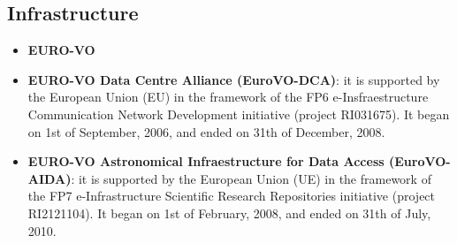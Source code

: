 \subsection{Infrastructure}
\begin{itemize}
\item \textbf{EURO-VO}
\item \textbf{EURO-VO Data Centre Alliance (EuroVO-DCA)}:
it is supported by the European Union (EU) in the framework of the FP6
e-Insfraestructure Communication Network Development initiative (project
RI031675). It began on 1st of September, 2006, and ended on 31th of December,
2008.

\item \textbf{EURO-VO Astronomical Infraestructure for Data Access
              (EuroVO-AIDA)}:
it is supported by the European Union (UE) in the framework of the FP7
e-Infrastructure Scientific Research Repositories initiative (project
RI2121104). It began on 1st of February, 2008, and ended on 31th of July, 2010.
\end{itemize}

